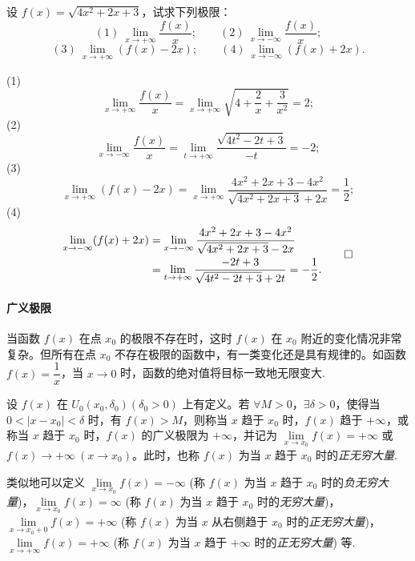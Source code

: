 \begin{example}\label{example:ma-3-1-9}
设 $f(x)=\sqrt{4x^2+2x+3}$，试求下列极限：
\[
  (1)\ \lim_{x\to+\infty}\frac{f(x)}{x};\qquad
  (2)\ \lim_{x\to-\infty}\frac{f(x)}{x};
\]
\[
  (3)\ \lim_{x\to+\infty}(f(x)-2x);\qquad
  (4)\ \lim_{x\to-\infty}(f(x)+2x).
\]
\end{example}


\begin{solve}
(1)
\[
  \lim_{x\to+\infty}\frac{f(x)}{x}
  =\lim_{x\to+\infty}\sqrt{4+\frac2x+\frac3{x^2}}=2;
\]
(2)
\[
  \lim_{x\to-\infty}\frac{f(x)}{x}
  =\lim_{t\to+\infty}\frac{\sqrt{4t^2-2t+3}}{-t}=-2;
\]
(3)
\[
  \lim_{x\to+\infty}(f(x)-2x)
  =\lim_{x\to+\infty}\frac{4x^2+2x+3-4x^2}{\sqrt{4x^2+2x+3}+2x}
  =\frac12;
\]
(4)
\[
\begin{aligned}
  \lim_{x\to-\infty}(f(x)+2x)
  &=\lim_{x\to-\infty}\frac{4x^2+2x+3-4x^2}{\sqrt{4x^2+2x+3}-2x}\\
  &=\lim_{t\to+\infty}\frac{-2t+3}{\sqrt{4t^2-2t+3}+2t}
  =-\frac12.
\end{aligned}
\qedhere
\]
\end{solve}


\paragraph*{广义极限}


当函数 $f(x)$ 在点 $x_0$ 的极限不存在时，这时 $f(x)$ 在 $x_0$ 附近的变化情况非常复杂。但所有在点 $x_0$ 不存在极限的函数中，有一类变化还是具有规律的。如函数 $f(x)=\dfrac1x$，当 $x\to0$ 时，函数的绝对值将目标一致地无限变大.

\begin{definition}\label{definition:ma-3-1-4}
设 $f(x)$ 在 $U_0(x_0,\delta_0)(\delta_0>0)$ 上有定义。若 $\forall M>0$，$\exists\delta>0$，使得当 $0<|x-x_0|<\delta$ 时，有 $f(x)>M$，则称当 $x$ 趋于 $x_0$ 时，$f(x)$ 趋于 $+\infty$，或称当 $x$ 趋于 $x_0$ 时，$f(x)$ 的广义极限为 $+\infty$，并记为 $\lim\limits_{x\to x_0}f(x)=+\infty$ 或 $f(x)\to+\infty\ (x\to x_0)$。此时，也称 $f(x)$ 为当 $x$ 趋于 $x_0$ 时的\emph{正无穷大量}.
\end{definition}

类似地可以定义 $\lim\limits_{x\to x_0}f(x)=-\infty$ (称 $f(x)$ 为当 $x$ 趋于 $x_0$ 时的\emph{负无穷大量})，$\lim\limits_{x\to x_0}f(x)=\infty$ (称 $f(x)$ 为当 $x$ 趋于 $x_0$ 时的\emph{无穷大量})，$\lim\limits_{x\to x_0+0}f(x)=+\infty$ (称 $f(x)$ 为当 $x$ 从右侧趋于 $x_0$ 时的\emph{正无穷大量})，$\lim\limits_{x\to+\infty}f(x)=+\infty$ (称 $f(x)$ 为当 $x$ 趋于 $+\infty$ 时的\emph{正无穷大量}) 等.

